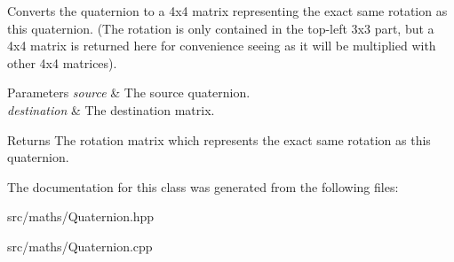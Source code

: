 Converts the quaternion to a 4x4 matrix representing the exact same rotation as this quaternion. (The rotation is only contained in the top-\/left 3x3 part, but a 4x4 matrix is returned here for convenience seeing as it will be multiplied with other 4x4 matrices). 


\begin{DoxyParams}{Parameters}
{\em source} & The source quaternion. \\
\hline
{\em destination} & The destination matrix.\\
\hline
\end{DoxyParams}
\begin{DoxyReturn}{Returns}
The rotation matrix which represents the exact same rotation as this quaternion. 
\end{DoxyReturn}


The documentation for this class was generated from the following files\+:\begin{DoxyCompactItemize}
\item 
src/maths/Quaternion.\+hpp\item 
src/maths/Quaternion.\+cpp\end{DoxyCompactItemize}
